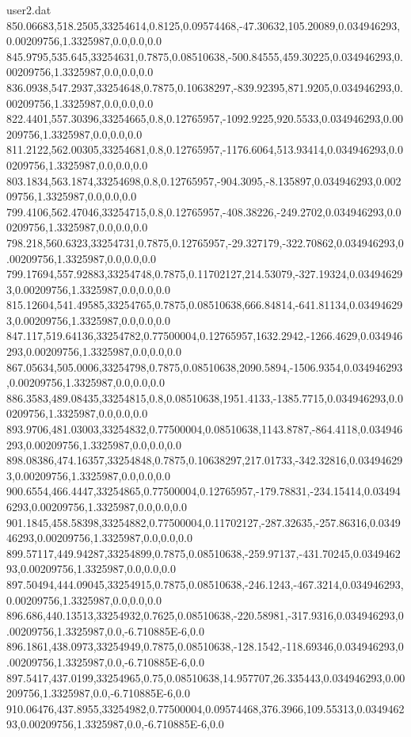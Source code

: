 \begin{filecontents}{user2.dat}
850.06683,518.2505,33254614,0.8125,0.09574468,-47.30632,105.20089,0.034946293,0.00209756,1.3325987,0.0,0.0,0.0
845.9795,535.645,33254631,0.7875,0.08510638,-500.84555,459.30225,0.034946293,0.00209756,1.3325987,0.0,0.0,0.0
836.0938,547.2937,33254648,0.7875,0.10638297,-839.92395,871.9205,0.034946293,0.00209756,1.3325987,0.0,0.0,0.0
822.4401,557.30396,33254665,0.8,0.12765957,-1092.9225,920.5533,0.034946293,0.00209756,1.3325987,0.0,0.0,0.0
811.2122,562.00305,33254681,0.8,0.12765957,-1176.6064,513.93414,0.034946293,0.00209756,1.3325987,0.0,0.0,0.0
803.1834,563.1874,33254698,0.8,0.12765957,-904.3095,-8.135897,0.034946293,0.00209756,1.3325987,0.0,0.0,0.0
799.4106,562.47046,33254715,0.8,0.12765957,-408.38226,-249.2702,0.034946293,0.00209756,1.3325987,0.0,0.0,0.0
798.218,560.6323,33254731,0.7875,0.12765957,-29.327179,-322.70862,0.034946293,0.00209756,1.3325987,0.0,0.0,0.0
799.17694,557.92883,33254748,0.7875,0.11702127,214.53079,-327.19324,0.034946293,0.00209756,1.3325987,0.0,0.0,0.0
815.12604,541.49585,33254765,0.7875,0.08510638,666.84814,-641.81134,0.034946293,0.00209756,1.3325987,0.0,0.0,0.0
847.117,519.64136,33254782,0.77500004,0.12765957,1632.2942,-1266.4629,0.034946293,0.00209756,1.3325987,0.0,0.0,0.0
867.05634,505.0006,33254798,0.7875,0.08510638,2090.5894,-1506.9354,0.034946293,0.00209756,1.3325987,0.0,0.0,0.0
886.3583,489.08435,33254815,0.8,0.08510638,1951.4133,-1385.7715,0.034946293,0.00209756,1.3325987,0.0,0.0,0.0
893.9706,481.03003,33254832,0.77500004,0.08510638,1143.8787,-864.4118,0.034946293,0.00209756,1.3325987,0.0,0.0,0.0
898.08386,474.16357,33254848,0.7875,0.10638297,217.01733,-342.32816,0.034946293,0.00209756,1.3325987,0.0,0.0,0.0
900.6554,466.4447,33254865,0.77500004,0.12765957,-179.78831,-234.15414,0.034946293,0.00209756,1.3325987,0.0,0.0,0.0
901.1845,458.58398,33254882,0.77500004,0.11702127,-287.32635,-257.86316,0.034946293,0.00209756,1.3325987,0.0,0.0,0.0
899.57117,449.94287,33254899,0.7875,0.08510638,-259.97137,-431.70245,0.034946293,0.00209756,1.3325987,0.0,0.0,0.0
897.50494,444.09045,33254915,0.7875,0.08510638,-246.1243,-467.3214,0.034946293,0.00209756,1.3325987,0.0,0.0,0.0
896.686,440.13513,33254932,0.7625,0.08510638,-220.58981,-317.9316,0.034946293,0.00209756,1.3325987,0.0,-6.710885E-6,0.0
896.1861,438.0973,33254949,0.7875,0.08510638,-128.1542,-118.69346,0.034946293,0.00209756,1.3325987,0.0,-6.710885E-6,0.0
897.5417,437.0199,33254965,0.75,0.08510638,14.957707,26.335443,0.034946293,0.00209756,1.3325987,0.0,-6.710885E-6,0.0
910.06476,437.8955,33254982,0.77500004,0.09574468,376.3966,109.55313,0.034946293,0.00209756,1.3325987,0.0,-6.710885E-6,0.0

\end{filecontents}

